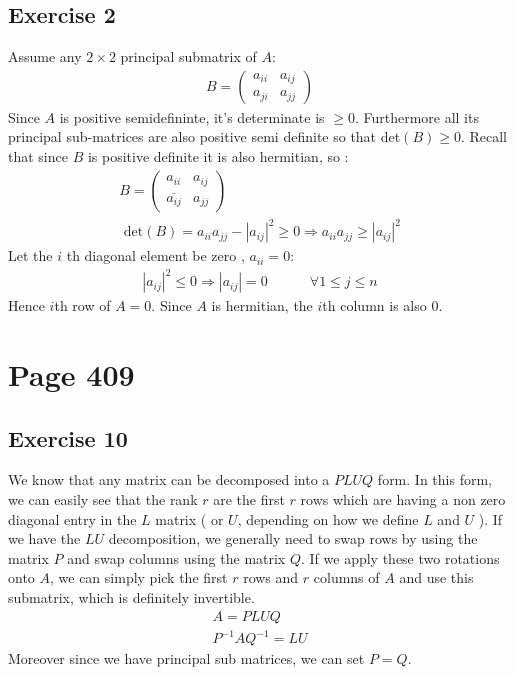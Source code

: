\subsection{Exercise 2}
Assume any $2 \times 2$ principal submatrix of $A$:
\begin{gather*}
B = \left( \begin{array}{cc}
a_{ii} & a_{ij}\\
a_{ji} & a_{jj}
\end{array} \right)
\end{gather*}
Since $A$ is positive semidefininte, it's determinate is $ \geq 0$. Furthermore all its principal sub-matrices are also positive semi definite so that det$(B)\geq 0$. Recall that since $B$ is positive definite it is also hermitian, so :
\begin{gather*}
B = \left( \begin{array}{cc}
a_{ii} & a_{ij}\\
\overline{a_{ij}} & a_{jj}
\end{array} \right)\\
\text{ det} (B)  = a_{ii}a_{jj} - |a_{ij}|^2 \geq 0  \Rightarrow a_{ii}a_{jj} \geq |a_{ij}|^2
\end{gather*}
Let the $i$ th diagonal element be zero , $a_{ii} = 0$:
\begin{gather*}
|a_{ij}|^2 \leq 0  \Rightarrow |a_{ij}| = 0 \quad \quad \quad \forall 1 \leq j \leq n
\end{gather*}
Hence $i$th row of $A = 0$. Since $A$ is hermitian, the $i$th column is also $0$.

\section{Page 409}
\subsection{Exercise 10}
We know that any matrix can be decomposed into a $PLUQ$ form. In this form, we can easily see that the rank $r$ are the first $r$ rows which are having a non zero diagonal entry in the $L$ matrix ( or $U$, depending on how we define $L$ and $U$ ). If we have the $LU$ decomposition, we generally need to swap rows by using the matrix $P$ and swap columns using the matrix $Q$. If we apply these two rotations onto $A$, we can simply pick the first $r$ rows and $r$ columns of $A$ and use this submatrix, which is definitely invertible.
\begin{gather*}
A = PLUQ \\
P^{-1} A Q^{-1} = LU
\end{gather*}
Moreover since we have principal sub matrices, we can set $P = Q$.
